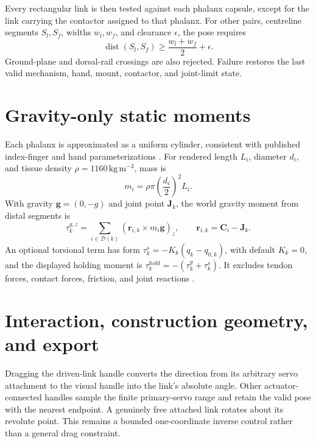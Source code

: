 \documentclass[11pt]{article}
\begin{document}
Every rectangular link is then tested against each phalanx capsule, except for
the link carrying the contactor assigned to that phalanx. For other pairs,
centreline segments $S_l,S_f$, widths $w_l,w_f$, and clearance $\epsilon$, the
pose requires
\begin{equation}
  \operatorname{dist}(S_l,S_f)\geq\frac{w_l+w_f}{2}+\epsilon.
\end{equation}
Ground-plane and dorsal-rail crossings are also rejected. Failure restores the
last valid mechanism, hand, mount, contactor, and joint-limit state.

\section{Gravity-only static moments}

Each phalanx is approximated as a uniform cylinder, consistent with published
index-finger and hand parameterizations
\cite{qiu2014orthopaedic,tsakonas2026handmass}. For rendered length $L_i$,
diameter $d_i$, and tissue density $\rho=1160\,\mathrm{kg\,m^{-3}}$, mass is
\begin{equation}
  m_i=\rho\pi\left(\frac{d_i}{2}\right)^2L_i.
\end{equation}
With gravity $\mathbf{g}=(0,-g)$ and joint point $\mathbf{J}_k$, the world
gravity moment from distal segments is
\begin{equation}
  \tau^{g,z}_k=\sum_{i\in\mathcal{D}(k)}
  (\mathbf{r}_{i,k}\times m_i\mathbf{g})_z,
  \qquad \mathbf{r}_{i,k}=\mathbf{C}_i-\mathbf{J}_k.
\end{equation}
An optional torsional term has form
$\tau^s_k=-K_k(q_k-q_{0,k})$, with default $K_k=0$, and the displayed holding
moment is $\tau^{hold}_k=-(\tau^g_k+\tau^s_k)$. It excludes tendon forces,
contact forces, friction, and joint reactions \cite{tsakonas2024parameter}.

\section{Interaction, construction geometry, and export}

Dragging the driven-link handle converts the direction from its arbitrary
servo attachment to the visual handle into the link's absolute angle. Other
actuator-connected handles sample the finite primary-servo range and retain the
valid pose with the nearest endpoint. A genuinely free attached link rotates
about its revolute point. This remains a bounded one-coordinate inverse control
rather than a general drag constraint.
\end{document}
